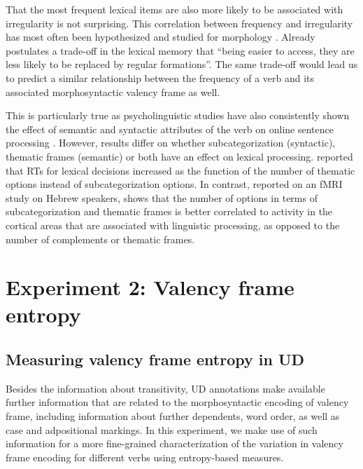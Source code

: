 That the most frequent lexical items are also more likely to be associated with irregularity is not surprising. This correlation between frequency and irregularity has most often been hypothesized and studied for morphology \citet{wu2019}. Already \citet{bybee1998} postulates a trade-off in the lexical memory that ``being easier to access, they are less likely to be replaced by regular formations''. The same trade-off would lead us to predict a similar relationship between the frequency of a verb and its associated morphosyntactic valency frame as well.

This is particularly true as psycholinguistic studies have also consistently shown the effect of semantic and syntactic attributes of the verb on online sentence processing \citep{shapiro1987,collina2001}. However, results differ on whether subcategorization (syntactic), thematic frames (semantic) or both have an effect on lexical processing. \citet{shapiro1987} reported that RTs for lexical decisions increased as the function of the number of thematic options instead of subcategorization options. In contrast, \citet{shetreet2007} reported on an fMRI study on Hebrew speakers, shows that the number of options in terms of subcategorization and thematic frames is better correlated to activity in the cortical areas that are associated with linguistic processing, as opposed to the number of complements or thematic frames. 

\section{Experiment 2: Valency frame entropy}
\subsection{Measuring valency frame entropy in UD}

Besides the information about transitivity, UD annotations make available further information that are related to the morphosyntactic encoding of valency frame, including information about further dependents, word order, as well as case and adpositional markings. In this experiment, we make use of such information for a more fine-grained characterization of the variation in valency frame encoding for different verbs using entropy-based measures.

